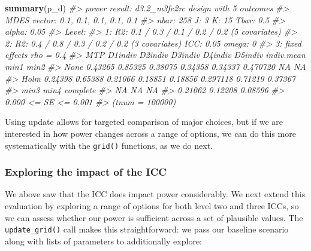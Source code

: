 \documentclass[
]{article}
\newenvironment{Shaded}{\begin{snugshade}}{\end{snugshade}}
\newcommand{\CommentTok}[1]{\textcolor[rgb]{0.56,0.35,0.01}{\textit{#1}}}
\newcommand{\KeywordTok}[1]{\textcolor[rgb]{0.13,0.29,0.53}{\textbf{#1}}}
\newcommand{\NormalTok}[1]{#1}
\begin{document}
\begin{Shaded}
\begin{Highlighting}[]
\KeywordTok{summary}\NormalTok{(p\_d)}
\CommentTok{\#\textgreater{} power result: d3.2\_m3fc2rc design with 5 outcomes}
\CommentTok{\#\textgreater{}   MDES vector: 0.1, 0.1, 0.1, 0.1, 0.1}
\CommentTok{\#\textgreater{}   nbar: 258  J: 3    K: 15   Tbar: 0.5}
\CommentTok{\#\textgreater{}   alpha: 0.05    }
\CommentTok{\#\textgreater{}   Level:}
\CommentTok{\#\textgreater{}     1: R2: 0.1 / 0.3 / 0.1 / 0.2 / 0.2 (5 covariates)}
\CommentTok{\#\textgreater{}     2: R2: 0.4 / 0.8 / 0.3 / 0.2 / 0.2 (3 covariates)    ICC: 0.05   omega: 0}
\CommentTok{\#\textgreater{}     3:   fixed effects    rho = 0.4}
\CommentTok{\#\textgreater{}   MTP D1indiv D2indiv D3indiv D4indiv D5indiv indiv.mean    min1    min2}
\CommentTok{\#\textgreater{}  None 0.43265 0.85325 0.38075 0.34358 0.34337   0.470720      NA      NA}
\CommentTok{\#\textgreater{}  Holm 0.24398 0.65388 0.21066 0.18851 0.18856   0.297118 0.71219 0.37367}
\CommentTok{\#\textgreater{}     min3    min4 complete}
\CommentTok{\#\textgreater{}       NA      NA       NA}
\CommentTok{\#\textgreater{}  0.21062 0.12208  0.08596}
\CommentTok{\#\textgreater{}  0.000 \textless{}= SE \textless{}= 0.001}
\CommentTok{\#\textgreater{}  (tnum = 100000)}
\end{Highlighting}
\end{Shaded}

Using update allows for targeted comparison of major choices, but if we
are interested in how power changes across a range of options, we can do
this more systematically with the \texttt{grid()} functions, as we do
next.

\subsubsection{Exploring the impact of the ICC}

We above saw that the ICC does impact power considerably. We next extend
this evaluation by exploring a range of options for both level two and
three ICCs, so we can assess whether our power is sufficient across a
set of plausible values. The \texttt{update\_grid()} call makes this
straightforward: we pass our baseline scenario along with lists of
parameters to additionally explore:
\end{document}
